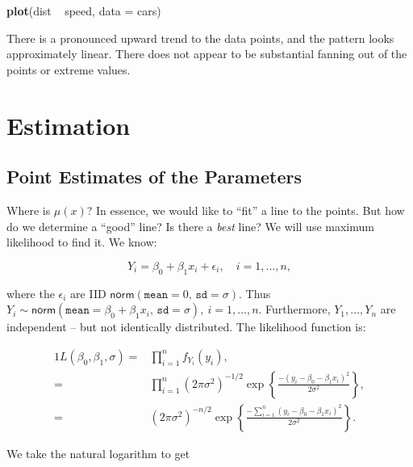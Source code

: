 \documentclass[]{book}
\newenvironment{Shaded}{\begin{snugshade}}{\end{snugshade}}
\newcommand{\KeywordTok}[1]{\textcolor[rgb]{0.13,0.29,0.53}{\textbf{{#1}}}}
\newcommand{\DataTypeTok}[1]{\textcolor[rgb]{0.13,0.29,0.53}{{#1}}}
\newcommand{\StringTok}[1]{\textcolor[rgb]{0.31,0.60,0.02}{{#1}}}
\newcommand{\NormalTok}[1]{{#1}}
\numberwithin{equation}{chapter}
\numberwithin{figure}{chapter}
\theoremstyle{plain}
\theoremstyle{definition}
\theoremstyle{remark}
\theoremstyle{definition}
\theoremstyle{definition}
\theoremstyle{remark}
\begin{document}
\begin{Shaded}
\begin{Highlighting}[]
\KeywordTok{plot}\NormalTok{(dist ~}\StringTok{ }\NormalTok{speed, }\DataTypeTok{data =} \NormalTok{cars)}
\end{Highlighting}
\end{Shaded}

There is a pronounced upward trend to the data points, and the pattern
looks approximately linear. There does not appear to be substantial
fanning out of the points or extreme values.

\section{Estimation}\label{sec-slr-estimation}

\subsection{Point Estimates of the
Parameters}\label{sub-point-estimate-mle-slr}

Where is \(\mu(x)\)? In essence, we would like to ``fit'' a line to the
points. But how do we determine a ``good'' line? Is there a \emph{best}
line? We will use maximum likelihood  to find
it. We know:

\begin{equation}
Y_{i} = \beta_{0} + \beta_{1}x_{i} + \epsilon_{i},\quad i=1,\ldots,n,
\end{equation}

where the \(\epsilon_{i}\) are IID
\(\mathsf{norm}(\mathtt{mean}=0,\,\mathtt{sd}=\sigma)\). Thus
\(Y_{i}\sim\mathsf{norm}(\mathtt{mean}=\beta_{0}+\beta_{1}x_{i},\,\mathtt{sd}=\sigma),\
i=1,\ldots,n\). Furthermore, \(Y_{1},\ldots,Y_{n}\) are independent --
but not identically distributed. The likelihood function
 is:

\begin{alignat}{1}
L(\beta_{0},\beta_{1},\sigma)= & \prod_{i=1}^{n}f_{Y_{i}}(y_{i}),\\
= & \prod_{i=1}^{n}(2\pi\sigma^{2})^{-1/2}\exp\left\{ \frac{-(y_{i}-\beta_{0}-\beta_{1}x_{i})^{2}}{2\sigma^{2}}\right\} ,\\
= & (2\pi\sigma^{2})^{-n/2}\exp\left\{ \frac{-\sum_{i=1}^{n}(y_{i}-\beta_{0}-\beta_{1}x_{i})^{2}}{2\sigma^{2}}\right\} .
\end{alignat}

We take the natural logarithm to get
\end{document}
